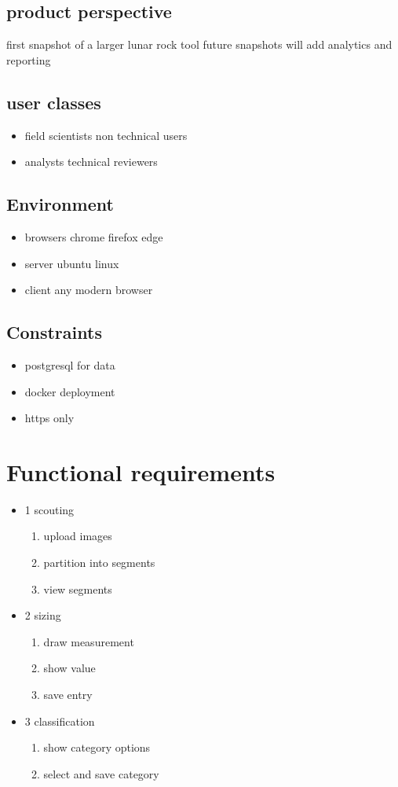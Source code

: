 \documentclass{article}
\begin{document}
\subsection{product perspective}
first snapshot of a larger lunar rock tool future snapshots will add analytics and reporting

\subsection{user classes}
\begin{itemize}
\item field scientists non technical users
\item analysts technical reviewers
\end{itemize}

\subsection{Environment}
\begin{itemize}
\item browsers chrome firefox edge
\item server ubuntu linux
\item client any modern browser
\end{itemize}

\subsection{Constraints}
\begin{itemize}
\item postgresql for data
\item docker deployment
\item https only
\end{itemize}

\section{Functional requirements}
\begin{itemize}
\item 1 scouting
\begin{enumerate}
\item upload images
\item partition into segments
\item view segments
\end{enumerate}
\item 2 sizing
\begin{enumerate}
\item draw measurement
\item show value
\item save entry
\end{enumerate}
\item 3 classification
\begin{enumerate}
\item show category options
\item select and save category
\end{enumerate}
\end{itemize}
\end{document}
